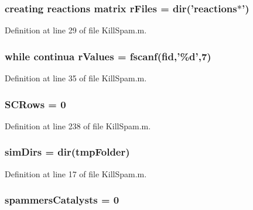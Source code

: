 \hypertarget{a00023_ad75735665492cabd747370126464fddf}{
\subsubsection[{r\-Files}]{\setlength{\rightskip}{0pt plus 5cm}creating {\bf reactions} matrix r\-Files = {\bf dir}('{\bf reactions}$\ast$')}}\label{a00023_ad75735665492cabd747370126464fddf}


Definition at line 29 of file Kill\-Spam.\-m.

\hypertarget{a00023_a436a6968124e560649654a4abbd9dac6}{
\subsubsection[{r\-Values}]{\setlength{\rightskip}{0pt plus 5cm}while {\bf continua} r\-Values = {\bf fscanf}({\bf fid},'\%d',7)}}\label{a00023_a436a6968124e560649654a4abbd9dac6}


Definition at line 35 of file Kill\-Spam.\-m.

\hypertarget{a00023_a4c9731061d3ea74c9ad35793b15491ab}{
\subsubsection[{S\-C\-Rows}]{\setlength{\rightskip}{0pt plus 5cm}S\-C\-Rows = 0}}\label{a00023_a4c9731061d3ea74c9ad35793b15491ab}


Definition at line 238 of file Kill\-Spam.\-m.

\hypertarget{a00023_aae5035eb84b89176ed5b06e136325eff}{
\subsubsection[{sim\-Dirs}]{\setlength{\rightskip}{0pt plus 5cm}sim\-Dirs = {\bf dir}({\bf tmp\-Folder})}}\label{a00023_aae5035eb84b89176ed5b06e136325eff}


Definition at line 17 of file Kill\-Spam.\-m.

\hypertarget{a00023_aac2cfcb79655911b15197407f3e8c51c}{
\subsubsection[{spammers\-Catalysts}]{\setlength{\rightskip}{0pt plus 5cm}spammers\-Catalysts = 0}}\label{a00023_aac2cfcb79655911b15197407f3e8c51c}


